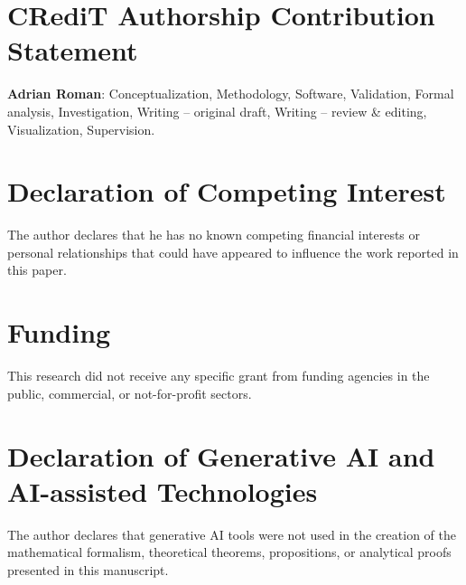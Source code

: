 \documentclass[final,3p,times]{elsarticle}
\begin{document}
\section*{CRediT Authorship Contribution Statement}
\textbf{Adrian Roman}: Conceptualization, Methodology, Software, Validation, Formal analysis, Investigation, Writing -- original draft, Writing -- review \& editing, Visualization, Supervision.

\section*{Declaration of Competing Interest}
The author declares that he has no known competing financial interests or personal relationships that could have appeared to influence the work reported in this paper.

\section*{Funding}
This research did not receive any specific grant from funding agencies in the public, commercial, or not-for-profit sectors.

\section*{Declaration of Generative AI and AI-assisted Technologies}
The author declares that generative AI tools were not used in the creation of the mathematical formalism, theoretical theorems, propositions, or analytical proofs presented in this manuscript.
\end{document}
